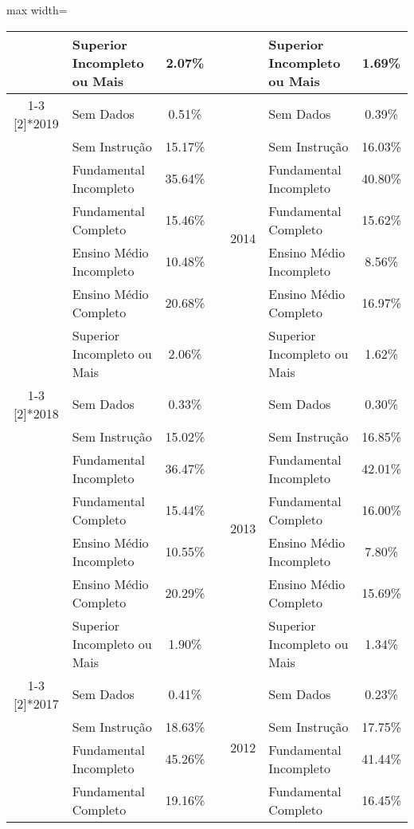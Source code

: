 \documentclass[14pt]{extarticle}
\begin{document}
\begin{table}[htbp]
\begin{adjustbox}{max width=\linewidth}
\begin{tabular}{clccclc}
         & Superior Incompleto ou Mais & 2.07\% &      &      & Superior Incompleto ou Mais & 1.69\% \\
\cmidrule{1-3}\cmidrule{5-7}    \multirow{7}[2]{*}{2019} & Sem Dados & 0.51\% &      & \multirow{7}[2]{*}{2014} & Sem Dados & 0.39\% \\
         & Sem Instrução & 15.17\% &      &      & Sem Instrução & 16.03\% \\
         & Fundamental Incompleto & 35.64\% &      &      & Fundamental Incompleto & 40.80\% \\
         & Fundamental Completo & 15.46\% &      &      & Fundamental Completo & 15.62\% \\
         & Ensino Médio Incompleto & 10.48\% &      &      & Ensino Médio Incompleto & 8.56\% \\
         & Ensino Médio Completo & 20.68\% &      &      & Ensino Médio Completo & 16.97\% \\
         & Superior Incompleto ou Mais & 2.06\% &      &      & Superior Incompleto ou Mais & 1.62\% \\
\cmidrule{1-3}\cmidrule{5-7}    \multirow{7}[2]{*}{2018} & Sem Dados & 0.33\% &      & \multirow{7}[2]{*}{2013} & Sem Dados & 0.30\% \\
         & Sem Instrução & 15.02\% &      &      & Sem Instrução & 16.85\% \\
         & Fundamental Incompleto & 36.47\% &      &      & Fundamental Incompleto & 42.01\% \\
         & Fundamental Completo & 15.44\% &      &      & Fundamental Completo & 16.00\% \\
         & Ensino Médio Incompleto & 10.55\% &      &      & Ensino Médio Incompleto & 7.80\% \\
         & Ensino Médio Completo & 20.29\% &      &      & Ensino Médio Completo & 15.69\% \\
         & Superior Incompleto ou Mais & 1.90\% &      &      & Superior Incompleto ou Mais & 1.34\% \\
\cmidrule{1-3}\cmidrule{5-7}    \multirow{7}[2]{*}{2017} & Sem Dados & 0.41\% &      & \multirow{7}[2]{*}{2012} & Sem Dados & 0.23\% \\
         & Sem Instrução & 18.63\% &      &      & Sem Instrução & 17.75\% \\
         & Fundamental Incompleto & 45.26\% &      &      & Fundamental Incompleto & 41.44\% \\
         & Fundamental Completo & 19.16\% &      &      & Fundamental Completo & 16.45\% \\

\end{tabular}
\end{adjustbox}
\end{table}
\end{document}
